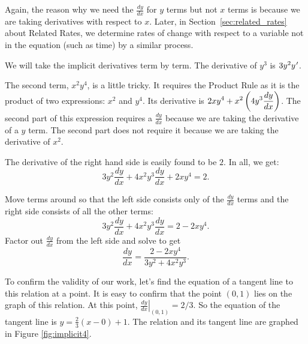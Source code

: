 Again, the reason why we need the $\frac{dy}{dx}$ for $y$ terms but not $x$ terms is because we are taking derivatives with respect to $x$.  Later, in Section~\ref{sec:related_rates} about Related Rates, we determine rates of change with respect to a variable not in the equation (such as time) by a similar process.\\


{We will take the implicit derivatives term by term. The derivative of $y^3$ is $3y^2y\hskip.75pt'$.  

The second term, $x^2y^4$, is a little tricky.  It requires the Product Rule as it is the product of two expressions: $x^2$ and $y^4$.  Its derivative is $\displaystyle 2xy^4 + x^2\left(4y^3\frac{dy}{dx}\right)$.  The second part of this expression requires a $\frac{dy}{dx}$ because we are taking the derivative of a $y$ term.  The second part does not require it because we are taking the derivative of $x^2$.  

The derivative of the right hand side is easily found to be $2$. In all, we get:
$$3y^2\frac{dy}{dx} + 4x^2y^3\frac{dy}{dx} + 2xy^4 = 2.$$

Move terms around so that the left side consists only of the $\frac{dy}{dx}$ terms and the right side consists of all the other terms:
$$3y^2\frac{dy}{dx} + 4x^2y^3\frac{dy}{dx} = 2-2xy^4.$$
Factor out $\frac{dy}{dx}$ from the left side and solve to get
$$\frac{dy}{dx} = \frac{2-2xy^4}{3y^2+4x^2y^3}.$$

To confirm the validity of our work, let's find the equation of a tangent line to this relation at a point. It is easy to confirm that the point $(0,1)$ lies on the graph of this relation. At this point, $\left.\frac{dy}{dx}\right|_{(0,1)} = 2/3$. So the equation of the tangent line is $y = \frac{2}{3}(x-0)+1$. The relation and its tangent line are graphed in Figure \ref{fig:implicit4}.


}\\

